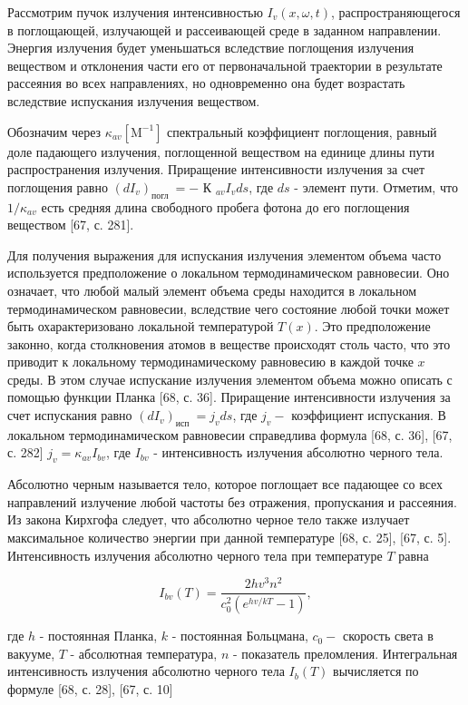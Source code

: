 \documentclass[10pt]{article}
\begin{document}
Рассмотрим пучок излучения интенсивностью $I_{v}(x, \omega, t)$, распространяющегося в поглощающей, излучающей и рассеивающей среде в заданном направлении. Энергия излучения будет уменьшаться вследствие поглощения излучения веществом и отклонения части его от первоначальной траектории в результате рассеяния во всех направлениях, но одновременно она будет возрастать вследствие испускания излучения веществом.

Обозначим через $\kappa_{a v}\left[\mathrm{M}^{-1}\right]$ спектральный коэффициент поглощения, равный доле падающего излучения, поглощенной веществом на единице длины пути распространения излучения. Приращение интенсивности излучения за счет поглощения равно $\left(d I_{v}\right)_{\text {погл }}=-$ К $_{a v} I_{v} d s$, где $d s$ - элемент пути. Отметим, что $1 / \kappa_{a v}$ есть средняя длина свободного пробега фотона до его поглощения веществом [67, с. 281].

Для получения выражения для испускания излучения элементом объема часто используется предположение о локальном термодинамическом равновесии. Оно означает, что любой малый элемент объема среды находится в локальном термодинамическом равновесии, вследствие чего состояние любой точки может быть охарактеризовано локальной температурой $T(x)$. Это предположение законно, когда столкновения атомов в веществе происходят столь часто, что это приводит к локальному термодинамическому равновесию в каждой точке $x$ среды. В этом случае испускание излучения элементом объема можно описать с помощью функции Планка [68, с. 36]. Приращение интенсивности излучения за счет испускания равно $\left(d I_{v}\right)_{\text {исп }}=j_{v} d s$, где $j_{v}-$ коэффициент испускания. В локальном термодинамическом равновесии справедлива формула [68, с. 36], [67, с. 282] $j_{v}=\kappa_{a v} I_{b v}$, где $I_{b v}$ - интенсивность излучения абсолютно черного тела.

Абсолютно черным называется тело, которое поглощает все падающее со всех направлений излучение любой частоты без отражения, пропускания и рассеяния. Из закона Кирхгофа следует, что абсолютно черное тело также излучает максимальное количество энергии при данной температуре [68, с. 25], [67, с. 5]. Интенсивность излучения абсолютно черного тела при температуре $T$ равна

$$
I_{b v}(T)=\frac{2 h v^{3} n^{2}}{c_{0}^{2}\left(e^{h v / k T}-1\right)},
$$

где $h$ - постоянная Планка, $k$ - постоянная Больцмана, $c_{0}-$ скорость света в вакууме, $T$ - абсолютная температура, $n$ - показатель преломления. Интегральная интенсивность излучения абсолютно черного тела $I_{b}(T)$ вычисляется по формуле [68, с. 28], [67, с. 10]
\end{document}
